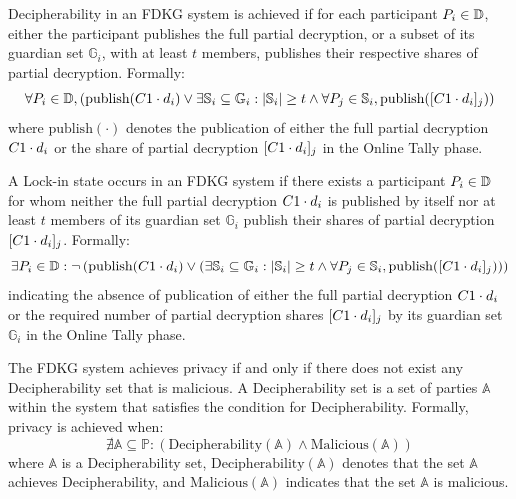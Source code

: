 \documentclass{article}
\begin{document}
\begin{definition}[Decipherability] \label{def:decipherability}
    Decipherability in an FDKG system is achieved if for each participant $P_{i} \in \mathbb{D}$, either the participant publishes the full partial decryption, or a subset of its guardian set $\mathbb{G}_i$, with at least $t$ members, publishes their respective shares of partial decryption. Formally: 
    \[
    \forall P_{i} \in \mathbb{D}, \left( \textrm{publish}(C1 \cdot d_{i}) \lor \exists \mathbb{S}_i \subseteq \mathbb{G}_i : |\mathbb{S}_i| \geq t \land \forall P_{j} \in \mathbb{S}_i, \textrm{publish}([C1 \cdot d_{i}]_{j}) \right)
    \]
    where \(\textrm{publish}(\cdot)\) denotes the publication of either the full partial decryption $C1 \cdot d_{i}$ or the share of partial decryption $[C1 \cdot d_{i}]_{j}$ in the Online Tally phase.
\end{definition}

\begin{definition}[Lock-in] \label{def:lock-in}
    A Lock-in state occurs in an FDKG system if there exists a participant $P_{i} \in \mathbb{D}$ for whom neither the full partial decryption $C1 \cdot d_{i}$ is published by  itself nor at least $t$ members of its guardian set $\mathbb{G}_i$ publish their shares of partial decryption $[C1 \cdot d_{i}]_{j}$. Formally:
    \[
    \exists P_{i} \in \mathbb{D} : \neg \left( \text{publish}(C1 \cdot d_{i}) \lor \left( \exists \mathbb{S}_i \subseteq \mathbb{G}_i : |\mathbb{S}_i| \geq t \land \forall P_{j} \in \mathbb{S}_i, \text{publish}([C1 \cdot d_{i}]_{j}) \right) \right)
    \]
    indicating the absence of publication of either the full partial decryption $C1 \cdot d_{i}$ or the required number of partial decryption shares $[C1 \cdot d_{i}]_{j}$ by its guardian set $\mathbb{G}_i$ in the Online Tally phase.
\end{definition}

\begin{definition}[Privacy] \label{def:privacy}
    The FDKG system achieves privacy if and only if there does not exist any Decipherability set that is malicious. A Decipherability set is a set of parties \( \mathbb{A} \) within the system that satisfies the condition for Decipherability. Formally, privacy is achieved when:
    \[
    \nexists \mathbb{A} \subseteq \mathbb{P} : (\text{Decipherability}(\mathbb{A}) \land \text{Malicious}(\mathbb{A}))
    \]
    where \( \mathbb{A} \) is a Decipherability set, \( \text{Decipherability}(\mathbb{A}) \) denotes that the set \( \mathbb{A} \) achieves Decipherability, and \( \text{Malicious}(\mathbb{A}) \) indicates that the set \( \mathbb{A} \) is malicious.
\end{definition}
\end{document}
